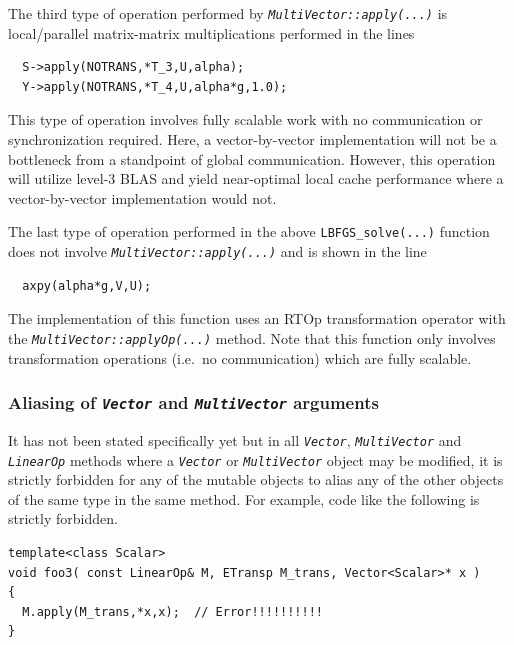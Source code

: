 The third type of operation performed by
{}\texttt{\textit{Multi\-Vector\-::apply(\-...)}} is local/parallel
matrix-matrix multiplications performed in the lines

{\scriptsize\begin{verbatim}
  S->apply(NOTRANS,*T_3,U,alpha);
  Y->apply(NOTRANS,*T_4,U,alpha*g,1.0);
\end{verbatim}}

{}\noindent{}This type of operation involves fully scalable work with
no communication or synchronization required.  Here, a
vector-by-vector implementation will not be a bottleneck from a
standpoint of global communication.  However, this operation will
utilize level-3 BLAS and yield near-optimal local cache performance
where a vector-by-vector implementation would not.

The last type of operation performed in the above
{}\texttt{LBFGS\_solve(...)}  function does not involve
{}\texttt{\textit{Multi\-Vector\-::apply(\-...)}} and is shown in the
line

{\scriptsize\begin{verbatim}
  axpy(alpha*g,V,U);
\end{verbatim}}

{}\noindent{}The implementation of this function uses an RTOp
transformation operator with the
{}\texttt{\textit{Multi\-Vector\-::applyOp(\-...)}}  method.  Note
that this function only involves transformation operations (i.e.~no
communication) which are fully scalable.

%
\subsubsection{Aliasing of {}\texttt{\textit{Vector}} and {}\texttt{\textit{Multi\-Vector}} arguments}
\label{tsfcore:sec:aliasing}
%

It has not been stated specifically yet but in all
{}\texttt{\textit{Vector}}, {}\texttt{\textit{Multi\-Vector}} and
{}\texttt{\textit{LinearOp}} methods where a
{}\texttt{\textit{Vector}} or {}\texttt{\textit{Multi\-Vector}} object
may be modified, it is strictly forbidden for any of the mutable
objects to alias any of the other objects of the same type in the same
method.  For example, code like the following is strictly forbidden.

{\scriptsize\begin{verbatim}
template<class Scalar>
void foo3( const LinearOp& M, ETransp M_trans, Vector<Scalar>* x )
{
  M.apply(M_trans,*x,x);  // Error!!!!!!!!!!
}
\end{verbatim}}


